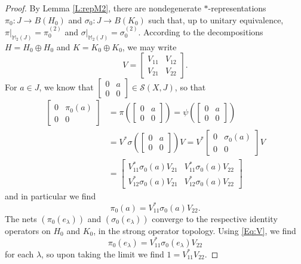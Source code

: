 \documentclass[10pt]{amsart}
\newcommand{\bM}{{\mathbb{M}}}
\renewcommand{\S}{{\mathcal{S}}}
\theoremstyle{definition}
\begin{document}
\begin{proof}
By Lemma \ref{L:repM2}, there are nondegenerate $*$-representations $\pi_0:J\to B(H_0)$ and $\sigma_0:J\to B(K_0)$ such that, up to unitary equivalence, $\pi|_{\bM_2(J)}=\pi_0^{(2)}$ and $\sigma|_{\bM_2(J)}=\sigma_0^{(2)}$. According to the decompositions $H=H_0\oplus H_0$ and $K=K_0\oplus K_0$, we may write 
\[
V=\begin{bmatrix}
V_{11} & V_{12}\\ V_{21} & V_{22}
\end{bmatrix}.
\]
For $a\in J$, we know that $\begin{bmatrix} 0 & a \\ 0 & 0 \end{bmatrix}\in \S(X,J)$, so that
\begin{align*}
\begin{bmatrix}
0 & \pi_0(a)\\ 0 & 0 
\end{bmatrix}&=\pi\left(\begin{bmatrix} 0 & a \\ 0 & 0 \end{bmatrix} \right)=\psi\left(\begin{bmatrix} 0 & a \\ 0 & 0 \end{bmatrix} \right)\\
&=V^* \sigma\left(\begin{bmatrix} 0 & a \\ 0 & 0 \end{bmatrix}\right)V=V^* \begin{bmatrix} 0 & \sigma_0(a)\\ 0 & 0 \end{bmatrix}V\\
&=\begin{bmatrix}
V_{11}^*\sigma_0(a)V_{21} & V_{11}^*\sigma_0(a)V_{22}\\ V_{12}^*\sigma_0(a)V_{21} & V_{12}^*\sigma_0(a)V_{22}
\end{bmatrix}
\end{align*}
and in particular we find 
\begin{equation}\label{Eq:V}
\pi_0(a)=V_{11}^*\sigma_0(a)V_{22}.
\end{equation}
The nets $(\pi_0(e_\lambda ))$ and $(\sigma_0(e_\lambda))$ converge to the respective identity operators on $H_0$ and $K_0$,  in the strong operator topology. Using \eqref{Eq:V}, we find
\[
\pi_0(e_\lambda)=V_{11}^*\sigma_0(e_\lambda)V_{22}
\]
for each $\lambda$, so upon taking the limit we find $1=V_{11}^* V_{22}$. 


\end{proof}
\end{document}

